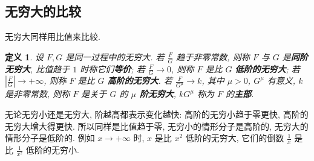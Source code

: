 \documentclass[UTF8,openany]{ctexbook}
\theoremstyle{chinesetextbook}
\newtheorem{definition}{定义}[section]
\begin{document}
\subsection{无穷大的比较}
无穷大同样用比值来比较.
\begin{definition}
设 $F,G$ 是同一过程中的无穷大. 若 $\displaystyle\frac FG$ 趋于非零常数, 则称 $F$ 与 $G$ 是\textbf{同阶无穷大}, 比值趋于 $1$ 时称它们\textbf{等价}; 若 $\displaystyle\frac FG\to0$, 则称 $F$ 是比 $G$ \textbf{低阶的无穷大}; 若 $\displaystyle\left|\frac FG\right|\to+\infty$, 则称 $F$ 是比 $G$ \textbf{高阶的无穷大}. 若 $\displaystyle\frac F{G^\mu}\to k$, 其中 $\mu>0$, $G^\mu$ 有意义, $k$ 是非零常数, 则称 $F$ 是关于 $G$ 的 \textbf{$\mu$ 阶无穷大}, $kG^\mu$ 称为 $F$ 的\textbf{主部}.
\end{definition}
无论无穷小还是无穷大, 阶越高都表示变化越快: 高阶的无穷小趋于零更快, 高阶的无穷大增大得更快. 所以同样是比值趋于零, 无穷小的情形分子是高阶的, 无穷大的情形分子是低阶的. 例如 $x\to+\infty$ 时, $x$ 是比 $x^2$ 低阶的无穷大, 它们的倒数 $\displaystyle\frac1x$ 是比 $\displaystyle\frac1{x^2}$ 低阶的无穷小.
\end{document}
